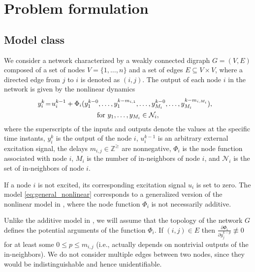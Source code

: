 \documentclass[letterpaper,10pt,journal]{IEEEtran}
\newcommand{\NN}{\mathcal{N}}
\begin{document}
\section{Problem formulation}\label{sec:problem}
\subsection{Model class}




We consider a network characterized by a weakly connected digraph $G=(V,E)$ composed of a set of nodes $V=\{1,\ldots,n\}$ and a set of edges $E\subseteq V\times V$, where a directed edge from $j$ to $i$ is denoted as $(i,j)$. The output of each node $i$ in the network is given by the nonlinear dynamics
\begin{multline}\label{eq:general_nonlinear}
\hspace{-3mm}y_i^k\!=\!u_i^{k-1}+\Phi_i(y_1^{k-0},\ldots,y_1^{k-m_{i,1}},\ldots,y_{M_i}^{k-0},\ldots,y_{M_i}^{k-m_{i,M_i}}), \\ \text{for } y_1,\ldots,y_{M_i}\in\NN_i,  
\end{multline}
where the superscripts of the inputs and outputs denote the values at the specific time instants, $y_i^k$ is the output of the node $i$, $u_i^{k-1}$ is an arbitrary external excitation signal, the delays $m_{i,j}\in \mathbb{Z}^{\ge}$ are nonnegative, $\Phi_i$ is the node function associated with node $i$, $M_i$  is the number of in-neighbors of node $i$, and $\NN_i$ is the set of in-neighbors of node $i$. 

If a node $i$ is not excited, its corresponding excitation signal $u_i$ is set to zero. 
The model  \eqref{eq:general_nonlinear} corresponds to a generalized version of the nonlinear model in \cite{vizuete2023nonlinear,vizuete2024partial}, where the node function $\Phi_i$ is not necessarily additive. 





Unlike the additive model in \cite{vizuete2023nonlinear,vizuete2026nonlinear,vizuete2024partial}, we will assume that the topology of the network $G$ defines the potential arguments of the function $\Phi_i$. If $(i,j)\in E$ then $\frac{\partial \Phi_i}{\partial y_j^{k-p}}\not\equiv 0$ for at least some $0\le p\le m_{i,j}$ (i.e., actually depends on nontrivial outputs of the in-neighbors). We do not consider multiple edges between two nodes, since they would be indistinguishable and hence unidentifiable.
\end{document}
